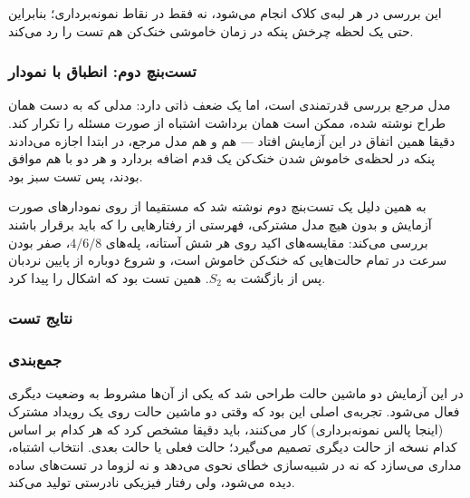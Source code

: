\documentclass[10pt,a4paper]{article}
\begin{document}
این بررسی در {هر} لبه‌ی کلاک انجام می‌شود، نه فقط در نقاط نمونه‌برداری؛ بنابراین حتی یک لحظه چرخش پنکه در زمان خاموشی خنک‌کن هم تست را رد می‌کند.

\begin{latin}

\end{latin}

\subsubsection*{تست‌بنچ دوم: انطباق با نمودار}

مدل مرجع بررسی قدرتمندی است، اما یک ضعف ذاتی دارد: مدلی که به دست {همان} طراح نوشته شده، ممکن است همان برداشت اشتباه از صورت مسئله را تکرار کند. دقیقا همین اتفاق در این آزمایش افتاد — هم  و هم مدل مرجع، در ابتدا اجازه می‌دادند پنکه در لحظه‌ی خاموش شدن خنک‌کن یک قدم اضافه بردارد و هر دو با هم موافق بودند، پس تست سبز بود.

به همین دلیل یک تست‌بنچ دوم نوشته شد که مستقیما از {روی نمودارهای صورت آزمایش} و بدون هیچ مدل مشترکی، فهرستی از رفتارهایی را که باید برقرار باشند بررسی می‌کند: مقایسه‌های اکید روی هر شش آستانه، پله‌های $4/6/8$، صفر بودن سرعت در تمام حالت‌هایی که خنک‌کن خاموش است، و شروع دوباره از پایین نردبان پس از بازگشت به $S_2$. همین تست بود که اشکال را پیدا کرد.

\begin{latin}

\end{latin}

\subsubsection*{نتایج تست}

\begin{latin}

\end{latin}

\subsubsection*{جمع‌بندی}

در این آزمایش دو ماشین حالت طراحی شد که یکی از آن‌ها {مشروط} به وضعیت دیگری فعال می‌شود. تجربه‌ی اصلی این بود که وقتی دو ماشین حالت روی یک رویداد مشترک (اینجا پالس نمونه‌برداری) کار می‌کنند، باید دقیقا مشخص کرد که هر کدام بر اساس {کدام نسخه} از حالت دیگری تصمیم می‌گیرد؛ حالت فعلی یا حالت بعدی. انتخاب اشتباه، مداری می‌سازد که نه در شبیه‌سازی خطای نحوی می‌دهد و نه لزوما در تست‌های ساده دیده می‌شود، ولی رفتار فیزیکی نادرستی تولید می‌کند.
\end{document}
